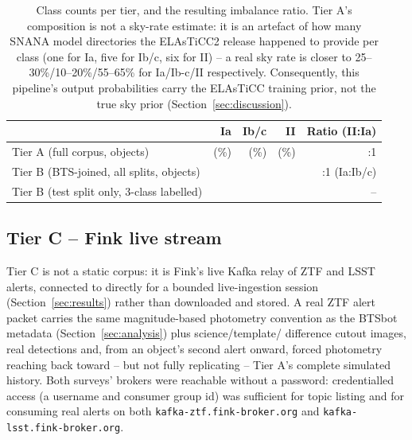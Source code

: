 \begin{table}[htb]
\centering
\caption{Class counts per tier, and the resulting imbalance ratio. Tier
A's composition is not a sky-rate estimate: it is an artefact of how many
SNANA model directories the ELAsTiCC2 release happened to provide per
class (one for Ia, five for Ib/c, six for II) -- a real sky rate is closer
to 25--30\%/10--20\%/55--65\% for Ia/Ib-c/II respectively. Consequently,
this pipeline's output probabilities carry the ELAsTiCC training prior,
not the true sky prior (Section~\ref{sec:discussion}).}
\label{tab:classcounts}
\footnotesize
\begin{tabular}{L{4.3cm}rrrr}
\toprule
& Ia & Ib/c & II & Ratio (II:Ia) \\
\midrule
Tier A (full corpus, \TierATotalObjects{} objects) &
  \TierACountIa{} (\TierAFracIa{}\%) &
  \TierACountIbc{} (\TierAFracIbc{}\%) &
  \TierACountII{} (\TierAFracII{}\%) & \TierAImbalanceRatio{}:1 \\
Tier B (BTS-joined, all splits, \TierBNObjTotal{} objects) &
  \TierBJoinCountIa{} & \TierBJoinCountIbc{} & \TierBJoinCountII{} &
  \TierBJoinRatio{}:1 (Ia:Ib/c) \\
Tier B (test split only, 3-class labelled) &
  \TierBSupportIa{} & \TierBSupportIbc{} & \TierBSupportII{} & -- \\
\bottomrule
\end{tabular}
\end{table}

\subsection{Tier C -- Fink live stream}

Tier C is not a static corpus: it is Fink's live Kafka relay of ZTF and
LSST alerts, connected to directly for a bounded live-ingestion session
(Section~\ref{sec:results}) rather than downloaded and stored. A real ZTF
alert packet carries the same magnitude-based photometry convention as the
BTSbot metadata (Section~\ref{sec:analysis}) plus science/template/
difference cutout images, real detections and, from an object's second
alert onward, forced photometry reaching back toward -- but not fully
replicating -- Tier A's complete simulated history. Both surveys' brokers
were reachable without a password: credentialled access (a username and
consumer group id) was sufficient for topic listing and for consuming real
alerts on both \texttt{kafka-ztf.fink-broker.org} and
\texttt{kafka-lsst.fink-broker.org}.

